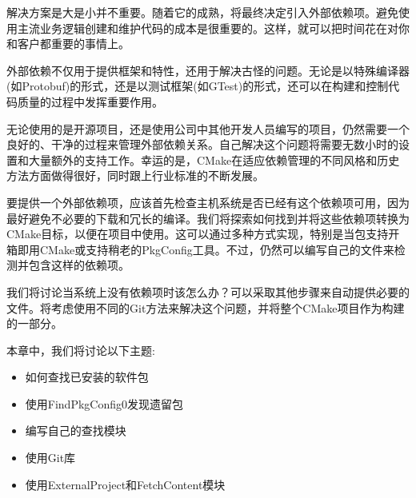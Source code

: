解决方案是大是小并不重要。随着它的成熟，将最终决定引入外部依赖项。避免使用主流业务逻辑创建和维护代码的成本是很重要的。这样，就可以把时间花在对你和客户都重要的事情上。

外部依赖不仅用于提供框架和特性，还用于解决古怪的问题。无论是以特殊编译器(如Protobuf)的形式，还是以测试框架(如GTest)的形式，还可以在构建和控制代码质量的过程中发挥重要作用。

无论使用的是开源项目，还是使用公司中其他开发人员编写的项目，仍然需要一个良好的、干净的过程来管理外部依赖关系。自己解决这个问题将需要无数小时的设置和大量额外的支持工作。幸运的是，CMake在适应依赖管理的不同风格和历史方法方面做得很好，同时跟上行业标准的不断发展。

要提供一个外部依赖项，应该首先检查主机系统是否已经有这个依赖项可用，因为最好避免不必要的下载和冗长的编译。我们将探索如何找到并将这些依赖项转换为CMake目标，以便在项目中使用。这可以通过多种方式实现，特别是当包支持开箱即用CMake或支持稍老的PkgConfig工具。不过，仍然可以编写自己的文件来检测并包含这样的依赖项。

我们将讨论当系统上没有依赖项时该怎么办？可以采取其他步骤来自动提供必要的文件。将考虑使用不同的Git方法来解决这个问题，并将整个CMake项目作为构建的一部分。

本章中，我们将讨论以下主题:

\begin{itemize}
\item 
如何查找已安装的软件包

\item 
使用FindPkgConfig0发现遗留包

\item 
编写自己的查找模块

\item 
使用Git库

\item 
使用ExternalProject和FetchContent模块
\end{itemize}
